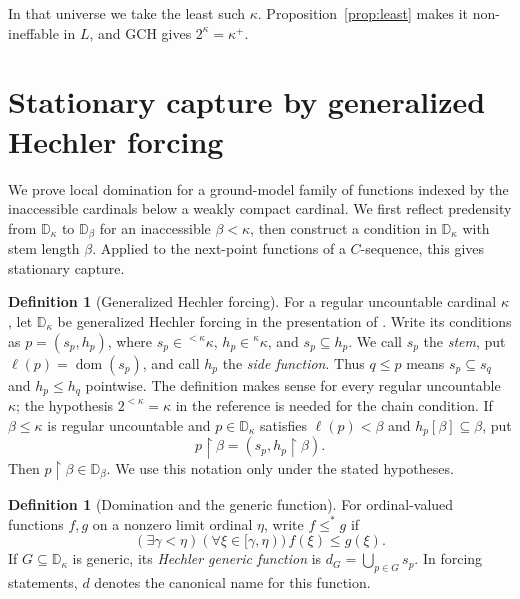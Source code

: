 \documentclass[10pt,a4paper]{amsart}
\theoremstyle{definition}
\newtheorem{definition}[theorem]{Definition}
\theoremstyle{remark}
\newcommand{\D}{\mathbb D}
\DeclareMathOperator{\dom}{dom}
\begin{document}
In that universe we take the least such \(\kappa\).
Proposition~\ref{prop:least} makes it non-ineffable in
\(L\), and GCH gives \(2^\kappa=\kappa^+\).

\section{Stationary capture by generalized Hechler forcing}
\label{sec:capture}

We prove local domination for a ground-model family of functions
indexed by the inaccessible cardinals below a weakly compact cardinal.
We first reflect predensity from \(\D_\kappa\) to \(\D_\beta\)
for an inaccessible \(\beta<\kappa\), then construct a condition
in \(\D_\kappa\) with stem length \(\beta\). Applied to the next-point
functions of a \(C\)-sequence,
this gives stationary capture.

\begin{definition}[Generalized Hechler forcing]\label{def:hechler}
For a regular uncountable cardinal \(\kappa\), let
\(\D_\kappa\) be generalized Hechler forcing in the presentation
of \cite[Definition~48]{BBFM}. Write its conditions as
\(p=(s_p,h_p)\), where \(s_p\in{}^{<\kappa}\kappa\),
\(h_p\in{}^\kappa\kappa\), and \(s_p\subseteq h_p\).
We call \(s_p\) the \emph{stem}, put \(\ell(p)=\dom(s_p)\),
and call \(h_p\) the \emph{side function}. Thus \(q\leq p\)
means \(s_p\subseteq s_q\) and \(h_p\leq h_q\) pointwise.
The definition makes sense for every regular uncountable
\(\kappa\); the hypothesis \(2^{<\kappa}=\kappa\) in the
reference is needed for the chain condition.
If \(\beta\leq\kappa\) is regular uncountable and
\(p\in\D_\kappa\) satisfies \(\ell(p)<\beta\) and
\(h_p[\beta]\subseteq\beta\), put
\[
 p\restriction\beta=(s_p,h_p\restriction\beta).
\]
Then \(p\restriction\beta\in\D_\beta\). We use this
notation only under the stated hypotheses.
\end{definition}

\begin{definition}[Domination and the generic function]
\label{def:eventual-domination}\label{def:generic-function}
For ordinal-valued functions \(f,g\) on a nonzero limit ordinal
\(\eta\), write \(f\leq^*g\) if
\[
 (\exists\gamma<\eta)(\forall\xi\in[\gamma,\eta))\,
 f(\xi)\leq g(\xi).
\]
If \(G\subseteq\D_\kappa\) is generic, its \emph{Hechler generic
function} is \(d_G=\bigcup_{p\in G}s_p\). In forcing statements,
\(d\) denotes the canonical name for this function.
\end{definition}
\end{document}
